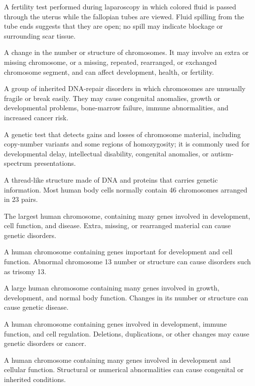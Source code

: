  A fertility test performed during laparoscopy in which colored fluid is passed through the uterus while the fallopian tubes are viewed. Fluid spilling from the tube ends suggests that they are open; no spill may indicate blockage or surrounding scar tissue.

 A change in the number or structure of chromosomes. It may involve an extra or missing chromosome, or a missing, repeated, rearranged, or exchanged chromosome segment, and can affect development, health, or fertility.

 A group of inherited DNA-repair disorders in which chromosomes are unusually fragile or break easily. They may cause congenital anomalies, growth or developmental problems, bone-marrow failure, immune abnormalities, and increased cancer risk.

 A genetic test that detects gains and losses of chromosome material, including copy-number variants and some regions of homozygosity; it is commonly used for developmental delay, intellectual disability, congenital anomalies, or autism-spectrum presentations.

 A thread-like structure made of DNA and proteins that carries genetic information. Most human body cells normally contain 46 chromosomes arranged in 23 pairs.

 The largest human chromosome, containing many genes involved in development, cell function, and disease. Extra, missing, or rearranged material can cause genetic disorders.

 A human chromosome containing genes important for development and cell function. Abnormal chromosome 13 number or structure can cause disorders such as trisomy 13.

 A large human chromosome containing many genes involved in growth, development, and normal body function. Changes in its number or structure can cause genetic disease.

 A human chromosome containing genes involved in development, immune function, and cell regulation. Deletions, duplications, or other changes may cause genetic disorders or cancer.

 A human chromosome containing many genes involved in development and cellular function. Structural or numerical abnormalities can cause congenital or inherited conditions.

